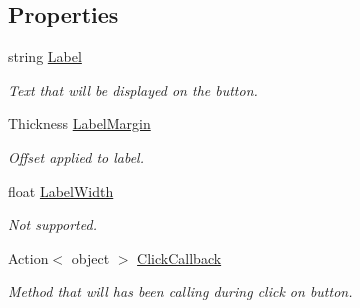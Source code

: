 \subsection*{Properties}
\begin{DoxyCompactItemize}
\item 
string \mbox{\hyperlink{class_wpf_handler_1_1_u_i_1_1_controls_1_1_flat_button_a2408c739aab8767dd0972dd0a7957abc}{Label}}
\begin{DoxyCompactList}\small\item\em Text that will be displayed on the button. \end{DoxyCompactList}\item 
Thickness \mbox{\hyperlink{class_wpf_handler_1_1_u_i_1_1_controls_1_1_flat_button_a3d54019f2c7f46783061412232d0d222}{Label\+Margin}}
\begin{DoxyCompactList}\small\item\em Offset applied to label. \end{DoxyCompactList}\item 
float \mbox{\hyperlink{class_wpf_handler_1_1_u_i_1_1_controls_1_1_flat_button_ad8f23ebbd9a85097d01940f80d372217}{Label\+Width}}
\begin{DoxyCompactList}\small\item\em Not supported. \end{DoxyCompactList}\item 
Action$<$ object $>$ \mbox{\hyperlink{class_wpf_handler_1_1_u_i_1_1_controls_1_1_flat_button_a4edcdc46b57a6db89144aa2c69e524a0}{Click\+Callback}}
\begin{DoxyCompactList}\small\item\em Method that will has been calling during click on button. \end{DoxyCompactList}\end{DoxyCompactItemize}

